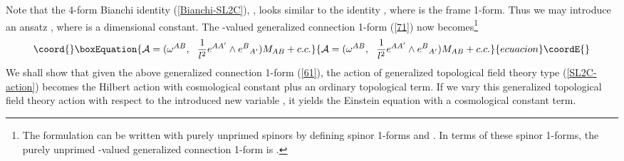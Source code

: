 \documentclass[a4paper,twocolumn,showpacs,prd]{revtex4}
\begin{document}
 Note that  the
4-form Bianchi identity (\ref{Bianchi-SL2C}), \coordHE{},
looks similar to the identity \coordHE{},
where \coordHE{} is the frame 1-form. Thus we may introduce an
ansatz \coordHE{}, where \coordHE{} is a
dimensional constant. The \coordHE{}-valued generalized connection
1-form (\ref{71}) now becomes{\footnote{The formulation can be
written with purely unprimed spinors by defining spinor 1-forms
\coordHE{} and \coordHE{} \cite{TJ}. In terms of
these spinor 1-forms, the purely unprimed \coordHE{}-valued
generalized connection 1-form
 is \coordHE{} .}}
\begin{equation}\coord{}\boxEquation{
{\cal A}=(\omega^{AB}, ~~{1\over l^2}
e^{AA'}\wedge e^B{}_{A'} ) M_{AB} +c.c.
\label{61}
}{
{\cal A}=(\omega^{AB}, ~~{1\over l^2}
e^{AA'}\wedge e^B{}_{A'} ) M_{AB} +c.c.
}{ecuacion}\coordE{}\end{equation}
We shall show that given the above generalized connection 1-form
(\ref{61}), the action of generalized topological field theory
type (\ref{SL2C-action}) becomes the Hilbert action with
cosmological constant plus an ordinary topological term. If we
vary this generalized topological field theory action with respect
to the introduced new variable \coordHE{}, it yields the Einstein
equation with a cosmological constant term.
\end{document}

